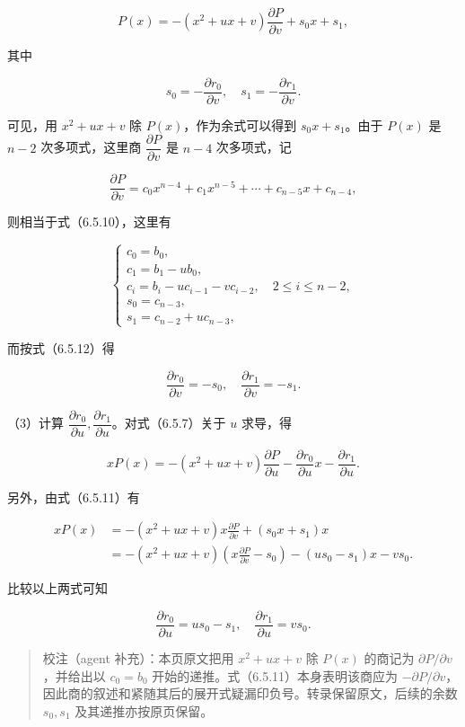 \documentclass[
  10pt,
  fontset=fandol]{ctexart}
\begin{document}
\[
P(x)=-(x^2+ux+v)\frac{\partial P}{\partial v}+s_0x+s_1,
\tag{6.5.11}
\]

其中

\[
s_0=-\frac{\partial r_0}{\partial v},\quad s_1=-\frac{\partial r_1}{\partial v}.
\tag{6.5.12}
\]

可见，用 \(x^2+ux+v\) 除 \(P(x)\)，作为余式可以得到 \(s_0x+s_1\)。由于 \(P(x)\) 是 \(n-2\) 次多项式，这里商 \(\dfrac{\partial P}{\partial v}\) 是 \(n-4\) 次多项式，记

\[
\frac{\partial P}{\partial v}=c_0x^{n-4}+c_1x^{n-5}+\cdots+c_{n-5}x+c_{n-4},
\]

则相当于式（6.5.10），这里有

\[
\begin{cases}
c_0=b_0,\\
c_1=b_1-ub_0,\\
c_i=b_i-uc_{i-1}-vc_{i-2},\quad2\leqslant i\leqslant n-2,\\
s_0=c_{n-3},\\
s_1=c_{n-2}+uc_{n-3},
\end{cases}
\]

而按式（6.5.12）得

\[
\frac{\partial r_0}{\partial v}=-s_0,\quad\frac{\partial r_1}{\partial v}=-s_1.
\]

（3）计算 \(\dfrac{\partial r_0}{\partial u},\dfrac{\partial r_1}{\partial u}\)。对式（6.5.7）关于 \(u\) 求导，得

\[
xP(x)=-(x^2+ux+v)\frac{\partial P}{\partial u}-\frac{\partial r_0}{\partial u}x-\frac{\partial r_1}{\partial u}.
\]

另外，由式（6.5.11）有

\[
\begin{aligned}
xP(x)&=-(x^2+ux+v)x\frac{\partial P}{\partial v}+(s_0x+s_1)x\\
&=-(x^2+ux+v)\left(x\frac{\partial P}{\partial v}-s_0\right)-(us_0-s_1)x-vs_0.
\end{aligned}
\]

比较以上两式可知

\[
\frac{\partial r_0}{\partial u}=us_0-s_1,\quad\frac{\partial r_1}{\partial u}=vs_0.
\]

\begin{quote}
校注（agent 补充）：本页原文把用 \(x^2+ux+v\) 除 \(P(x)\) 的商记为 \(\partial P/\partial v\)，并给出以 \(c_0=b_0\) 开始的递推。式（6.5.11）本身表明该商应为 \(-\partial P/\partial v\)，因此商的叙述和紧随其后的展开式疑漏印负号。转录保留原文，后续的余数 \(s_0,s_1\) 及其递推亦按原页保留。
\end{quote}
\end{document}
